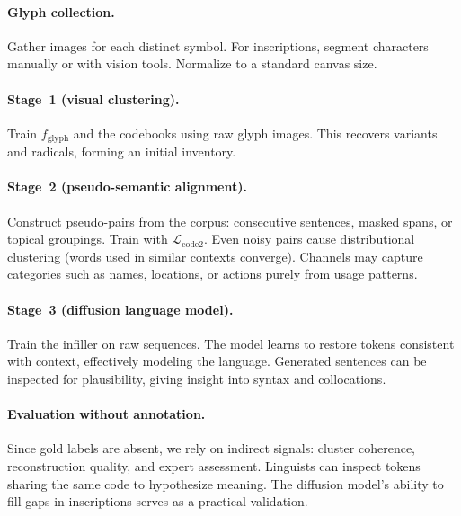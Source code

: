 \documentclass[10pt,twocolumn]{article}
\begin{document}
\paragraph{Glyph collection.} Gather images for each distinct symbol. For inscriptions, segment characters manually or with vision tools. Normalize to a standard canvas size.

\paragraph{Stage~1 (visual clustering).} Train $f_{\text{glyph}}$ and the codebooks using raw glyph images. This recovers variants and radicals, forming an initial inventory.

\paragraph{Stage~2 (pseudo-semantic alignment).} Construct pseudo-pairs from the corpus: consecutive sentences, masked spans, or topical groupings. Train with $\mathcal{L}_{\text{code2}}$. Even noisy pairs cause distributional clustering (words used in similar contexts converge). Channels may capture categories such as names, locations, or actions purely from usage patterns.

\paragraph{Stage~3 (diffusion language model).} Train the infiller on raw sequences. The model learns to restore tokens consistent with context, effectively modeling the language. Generated sentences can be inspected for plausibility, giving insight into syntax and collocations.

\paragraph{Evaluation without annotation.} Since gold labels are absent, we rely on indirect signals: cluster coherence, reconstruction quality, and expert assessment. Linguists can inspect tokens sharing the same code to hypothesize meaning. The diffusion model's ability to fill gaps in inscriptions serves as a practical validation.
\end{document}
